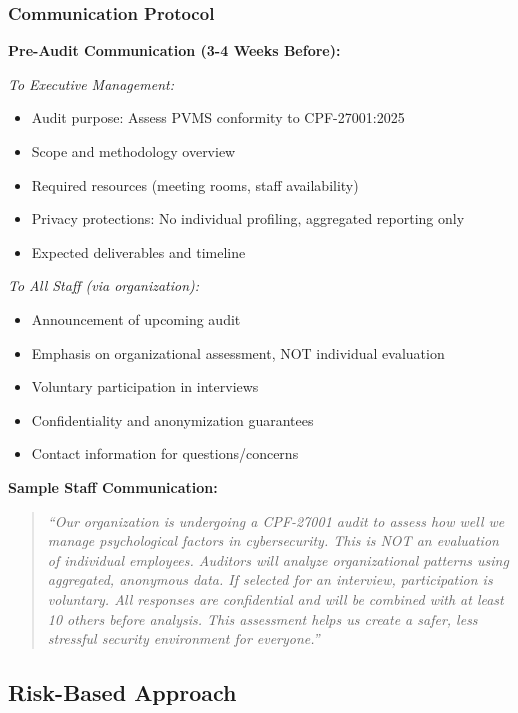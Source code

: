 \documentclass[11pt,a4paper]{article}
\begin{document}
\subsubsection{Communication Protocol}

\textbf{Pre-Audit Communication (3-4 Weeks Before):}

\textit{To Executive Management:}
\begin{itemize}
\item Audit purpose: Assess PVMS conformity to CPF-27001:2025
\item Scope and methodology overview
\item Required resources (meeting rooms, staff availability)
\item Privacy protections: No individual profiling, aggregated reporting only
\item Expected deliverables and timeline
\end{itemize}

\textit{To All Staff (via organization):}
\begin{itemize}
\item Announcement of upcoming audit
\item Emphasis on organizational assessment, NOT individual evaluation
\item Voluntary participation in interviews
\item Confidentiality and anonymization guarantees
\item Contact information for questions/concerns
\end{itemize}

\textbf{Sample Staff Communication:}

\begin{quote}
\textit{``Our organization is undergoing a CPF-27001 audit to assess how well we manage psychological factors in cybersecurity. This is NOT an evaluation of individual employees. Auditors will analyze organizational patterns using aggregated, anonymous data. If selected for an interview, participation is voluntary. All responses are confidential and will be combined with at least 10 others before analysis. This assessment helps us create a safer, less stressful security environment for everyone.''}
\end{quote}

\subsection{Risk-Based Approach}
\end{document}
